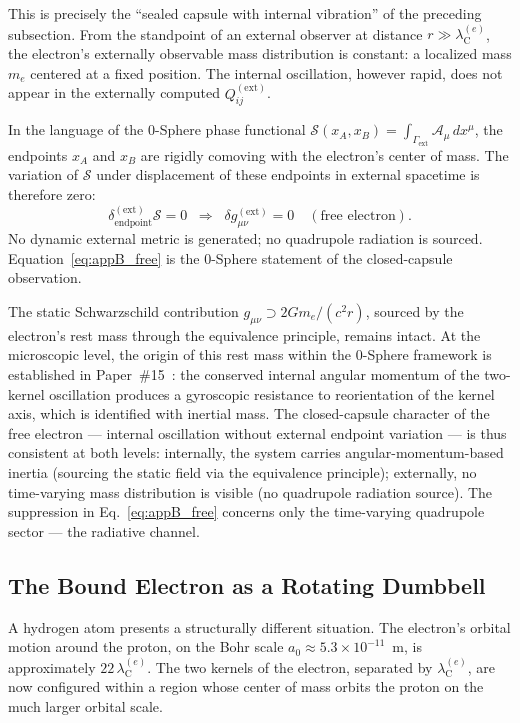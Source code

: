 \documentclass[%
 reprint, amsmath,amssymb, aps, prd, ]{revtex4-2}
\numberwithin{equation}{section}
\newcommand{\lambdaCe}{\lambda_{\mathrm{C}}^{(e)}}
\begin{document}
This is precisely the ``sealed capsule with internal vibration'' of the preceding subsection.
From the standpoint of an external observer at distance $r \gg \lambdaCe$, the electron's externally observable mass distribution is constant: a localized mass $m_e$ centered at a fixed position.
The internal oscillation, however rapid, does not appear in the externally computed $Q_{ij}^{(\mathrm{ext})}$.

In the language of the 0-Sphere phase functional $\mathcal{S}(x_A, x_B) = \int_{\Gamma_{\mathrm{ext}}} \mathcal{A}_\mu\, dx^\mu$, the endpoints $x_A$ and $x_B$ are rigidly comoving with the electron's center of mass.
The variation of $\mathcal{S}$ under displacement of these endpoints in external spacetime is therefore zero:
\begin{equation}
\delta_{\mathrm{endpoint}}^{(\mathrm{ext})}\mathcal{S} = 0
\;\;\Longrightarrow\;\;
\delta g_{\mu\nu}^{(\mathrm{ext})} = 0
\quad (\text{free electron}).
\label{eq:appB_free}
\end{equation}
No dynamic external metric is generated; no quadrupole radiation is sourced.
Equation~\eqref{eq:appB_free} is the 0-Sphere statement of the closed-capsule observation.

The static Schwarzschild contribution $g_{\mu\nu} \supset 2Gm_e/(c^2 r)$, sourced by the electron's rest mass through the equivalence principle, remains intact. At the microscopic level, the origin of this rest mass within the 0-Sphere framework is established in Paper~\#15~\cite{hanamura15}: the conserved internal angular momentum of the two-kernel oscillation produces a gyroscopic resistance to reorientation of the kernel axis, which is identified with inertial mass. The closed-capsule character of the free electron --- internal oscillation without external endpoint variation --- is thus consistent at both levels: internally, the system carries angular-momentum-based inertia (sourcing the static field via the equivalence principle); externally, no time-varying mass distribution is visible (no quadrupole radiation source).
The suppression in Eq.~\eqref{eq:appB_free} concerns only the time-varying quadrupole sector --- the radiative channel.

\subsection{The Bound Electron as a Rotating Dumbbell}

A hydrogen atom presents a structurally different situation.
The electron's orbital motion around the proton, on the Bohr scale $a_0 \approx 5.3 \times 10^{-11}$~m, is approximately $22\,\lambdaCe$.
The two kernels of the electron, separated by $\lambdaCe$, are now configured within a region whose center of mass orbits the proton on the much larger orbital scale.
\end{document}
